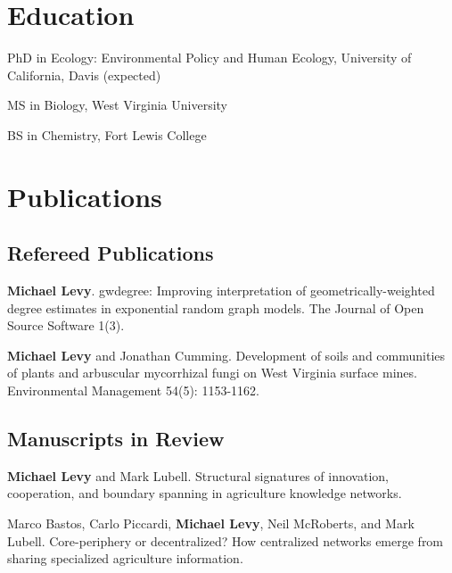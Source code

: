 \section{Education}\label{education}

\begin{description}
\tightlist
\item[2017]
PhD in Ecology: Environmental Policy and Human Ecology, University of
California, Davis (expected)
\item[2012]
MS in Biology, West Virginia University
\item[2004]
BS in Chemistry, Fort Lewis College
\end{description}

\section{Publications}\label{publications}

\subsection{Refereed Publications}\label{refereed-publications}

\begin{description}
\tightlist
\item[2016]
\textbf{Michael Levy}. gwdegree: Improving interpretation of
geometrically-weighted degree estimates in exponential random graph
models. The Journal of Open Source Software 1(3).
\item[2014]
\textbf{Michael Levy} and Jonathan Cumming. Development of soils and
communities of plants and arbuscular mycorrhizal fungi on West Virginia
surface mines. Environmental Management 54(5): 1153-1162.
\end{description}

\subsection{Manuscripts in Review}\label{manuscripts-in-review}

\begin{description}
\tightlist
\item[\phantom{2016}]
\textbf{Michael Levy} and Mark Lubell. Structural signatures of
innovation, cooperation, and boundary spanning in agriculture knowledge
networks.
\item[\phantom{2016}]
Marco Bastos, Carlo Piccardi, \textbf{Michael Levy}, Neil McRoberts, and
Mark Lubell. Core-periphery or decentralized? How centralized networks
emerge from sharing specialized agriculture information.
\end{description}

